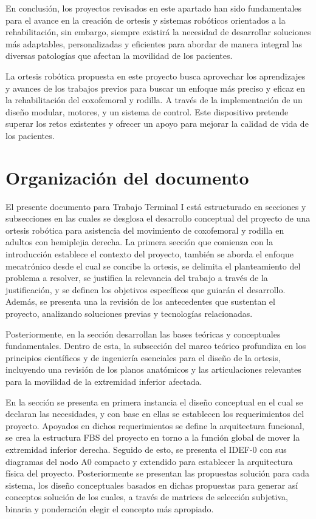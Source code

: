 En conclusión, los proyectos revisados en este apartado han sido fundamentales para el avance en la creación de ortesis y sistemas robóticos orientados a la rehabilitación, sin embargo, siempre existirá la necesidad de desarrollar soluciones más adaptables, personalizadas y eficientes para abordar de manera integral las diversas patologías que afectan la movilidad de los pacientes.

La ortesis robótica propuesta en este proyecto busca aprovechar los aprendizajes y avances de los trabajos previos para buscar un enfoque más preciso y eficaz en la rehabilitación del coxofemoral y rodilla. A través de la implementación de un diseño modular, motores, y un sistema de control. Este dispositivo pretende superar los retos existentes y ofrecer un apoyo para mejorar la calidad de vida de los pacientes.

\section{Organización del documento}
El presente documento para Trabajo Terminal I está estructurado en secciones y subsecciones en las cuales se desglosa el desarrollo conceptual del proyecto de una ortesis robótica para asistencia del movimiento de coxofemoral y rodilla en adultos con hemiplejia derecha. La primera sección que comienza con la introducción establece el contexto del proyecto, también se aborda el enfoque mecatrónico desde el cual se concibe la ortesis, se delimita el planteamiento del problema a resolver, se justifica la relevancia del trabajo a través de la justificación, y se definen los objetivos específicos que guiarán el desarrollo. Además, se presenta una la revisión de los antecedentes que sustentan el proyecto, analizando soluciones previas y tecnologías relacionadas.

Posteriormente, en la sección  desarrollan las bases teóricas y conceptuales fundamentales. Dentro de esta, la subsección del marco teórico profundiza en los principios científicos y de ingeniería esenciales para el diseño de la ortesis, incluyendo una revisión de los planos anatómicos y las articulaciones relevantes para la movilidad de la extremidad inferior afectada.

En la sección  se presenta en primera instancia el diseño conceptual en el cual se declaran las necesidades, y con base en ellas se establecen los requerimientos del proyecto. Apoyados en dichos requerimientos se define la arquitectura funcional, se crea la estructura FBS del proyecto en torno a la función global de mover la extremidad inferior derecha. Seguido de esto, se presenta el IDEF-0 con sus diagramas del nodo A0 compacto y extendido para establecer la arquitectura física del proyecto. Posteriormente se presentan las propuestas solución para cada sistema, los diseño conceptuales basados en dichas propuestas para generar así conceptos solución de los cuales, a través de matrices de selección subjetiva, binaria y ponderación elegir el concepto más apropiado.

